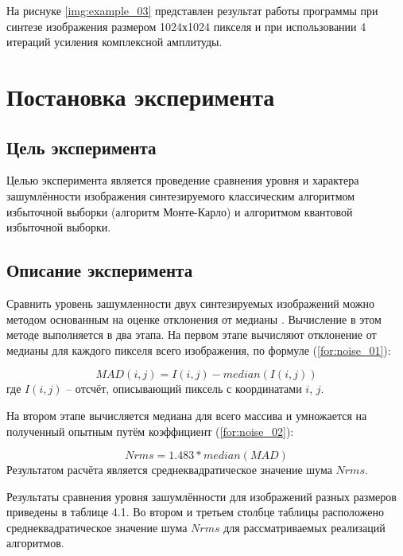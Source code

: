 На риснуке \ref{img:example_03} представлен результат работы программы при синтезе изображения размером 1024х1024 пикселя и при использовании 4 итераций усиления комплексной амплитуды.

\section{Постановка эксперимента} 

\subsection{Цель эксперимента}

Целью эксперимента является проведение сравнения уровня и характера зашумлённости изображения синтезируемого классическим алгоритмом избыточной выборки (алгоритм Монте-Карло) и алгоритмом квантовой избыточной выборки.

\subsection{Описание эксперимента}

Сравнить уровень зашумленности двух синтезируемых изображений можно методом основанным на оценке отклонения от медианы \cite{noise}. Вычисление в этом методе выполняется в два этапа. На первом этапе вычисляют отклонение от медианы для каждого пикселя всего изображения, по формуле (\ref{for:noise_01}):

\begin{equation} 
	\label{for:noise_01}
	MAD(i, j) = I(i, j) - median(I(i, j))
\end{equation}
где $I(i, j)$ -- отсчёт, описывающий пиксель с координатами $i$, $j$.

На втором этапе вычисляется медиана для всего массива и умножается на полученный опытным путём коэффициент (\ref{for:noise_02}):

\begin{equation} 
	\label{for:noise_02}
	Nrms = 1.483 * median(MAD)
\end{equation}
Результатом расчёта является среднеквадратическое значение шума $Nrms$.

Результаты сравнения уровня зашумлённости для изображений разных размеров приведены в таблице 4.1. Во втором и третьем столбце таблицы расположено среднеквадратическое значение шума $Nrms$ для рассматриваемых реализаций алгоритмов.

